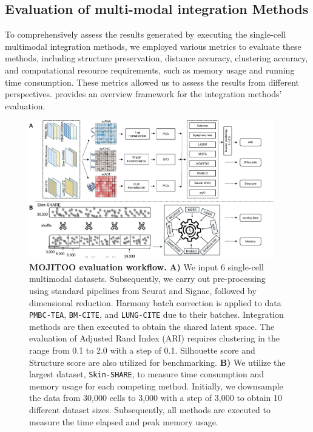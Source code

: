 \subsection{Evaluation of multi-modal integration Methods}
\label{MOJITOO:exp:metrics}

To comprehensively assess the results generated by executing the single-cell multimodal integration methods, we employed various metrics to evaluate these methods, including structure preservation, distance accuracy, clustering accuracy, and computational resource requirements, such as memory usage and running time consumption. These metrics allowed us to assess the results from different perspectives.  provides an overview framework for the integration methods' evaluation.
\begin{figure}[!ht]
	\centering
	\includegraphics[width=0.95\textwidth]{evaluation_MOJITOO/fig}
	\vspace{0.1cm}
	\caption[MOJITOO evaluation workflow]{
	\textbf{MOJITOO evaluation workflow.} \textbf{A)} We input 6 single-cell multimodal datasets. Subsequently, we carry out pre-processing using standard pipelines from Seurat and Signac, followed by dimensional reduction. Harmony batch correction is applied to data \texttt{PMBC-TEA}, \texttt{BM-CITE}, and \texttt{LUNG-CITE} due to their batches. Integration methods are then executed to obtain the shared latent space. The evaluation of Adjusted Rand Index (ARI) requires clustering in the range from 0.1 to 2.0 with a step of 0.1. Silhouette score and Structure score are also utilized for benchmarking. \textbf{B)} We utilize the largest dataset, \texttt{Skin-SHARE}, to measure time consumption and memory usage for each competing method. Initially, we downsample the data from 30,000 cells to 3,000 with a step of 3,000 to obtain 10 different dataset sizes. Subsequently, all methods are executed to measure the time elapsed and peak memory usage.} 
	\label{fig:evaluation_MOJITOO}
\end{figure}

